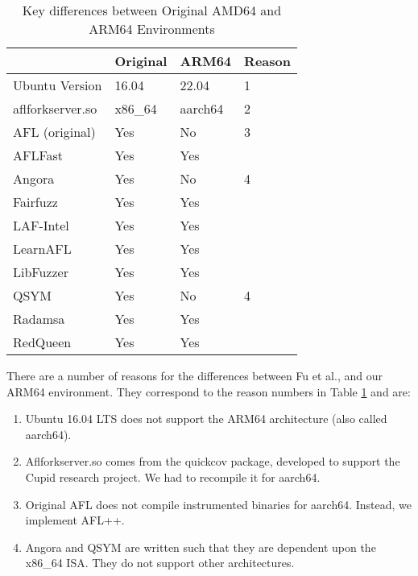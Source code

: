 \begin{table}[ht]
    \begin{tabular}{|l|l|l|l|}
        \hline
                        & Original\cite{Fu} & ARM64 & Reason \\
        \hline
        Ubuntu Version  & 16.04             & 22.04 & 1 \\
        \hline
        aflforkserver.so    & x86\_64           & aarch64 & 2 \\
        \hline
        AFL (original)  & Yes               & No & 3 \\
        \hline
        AFLFast         & Yes               & Yes & \\
        \hline
        Angora          & Yes               & No & 4 \\
        \hline
        Fairfuzz        & Yes               & Yes & \\
        \hline
        LAF-Intel       & Yes               & Yes & \\
        \hline
        LearnAFL        & Yes               & Yes & \\
        \hline
        LibFuzzer       & Yes               & Yes & \\
        \hline
        QSYM            & Yes               & No & 4 \\
        \hline
        Radamsa         & Yes               & Yes & \\
        \hline
        RedQueen        & Yes               & Yes & \\
        \hline
    \end{tabular}
    \caption{Key differences between Original AMD64 and ARM64 Environments}
    \label{arm64-characteristics}
\end{table}

There are a number of reasons for the differences between Fu et al., 
and our ARM64 environment. They correspond to the reason numbers in Table \ref{arm64-characteristics}
and are:
\begin{enumerate}
    \item Ubuntu 16.04 LTS does not support the ARM64 architecture (also called aarch64).
    \item Aflforkserver.so comes from the quickcov package, developed to support the Cupid
    research project\cite{guler2020cupid}. We had to recompile it for aarch64.
    \item Original AFL does not compile instrumented binaries for aarch64. Instead, we
    implement AFL++.
    \item Angora and QSYM are written such that they are dependent upon the x86\_64 ISA.
    They do not support other architectures.
\end{enumerate}

